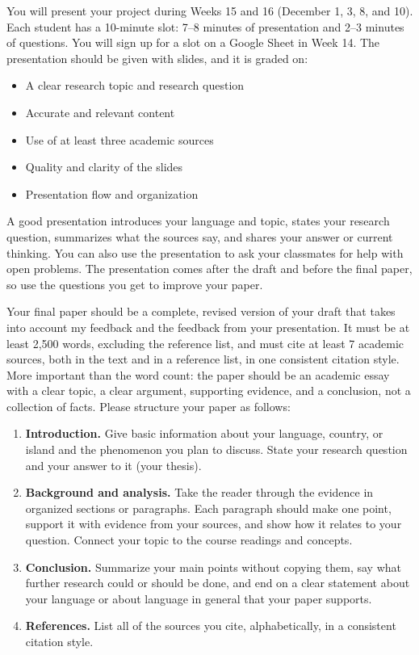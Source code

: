 \documentclass[11pt]{article}
\newcommand{\sect}[1]{\vspace{0.9em}{\large\textbf{#1}}\par\vspace{-0.2em}}
\begin{document}
\sect{Presentation}
You will present your project during Weeks 15 and 16 (December 1, 3, 8, and 10). Each student has a 10-minute slot: 7--8 minutes of presentation and 2--3 minutes of questions. You will sign up for a slot on a Google Sheet in Week 14. The presentation should be given with slides, and it is graded on:

\begin{itemize}
\item A clear research topic and research question
\item Accurate and relevant content
\item Use of at least three academic sources
\item Quality and clarity of the slides
\item Presentation flow and organization
\end{itemize}

A good presentation introduces your language and topic, states your research question, summarizes what the sources say, and shares your answer or current thinking. You can also use the presentation to ask your classmates for help with open problems. The presentation comes after the draft and before the final paper, so use the questions you get to improve your paper.

\sect{Final paper}
Your final paper should be a complete, revised version of your draft that takes into account my feedback and the feedback from your presentation. It must be at least 2,500 words, excluding the reference list, and must cite at least 7 academic sources, both in the text and in a reference list, in one consistent citation style. More important than the word count: the paper should be an academic essay with a clear topic, a clear argument, supporting evidence, and a conclusion, not a collection of facts. Please structure your paper as follows:

\begin{enumerate}[label=\alph*.]
\item \textbf{Introduction.} Give basic information about your language, country, or island and the phenomenon you plan to discuss. State your research question and your answer to it (your thesis).
\item \textbf{Background and analysis.} Take the reader through the evidence in organized sections or paragraphs. Each paragraph should make one point, support it with evidence from your sources, and show how it relates to your question. Connect your topic to the course readings and concepts.
\item \textbf{Conclusion.} Summarize your main points without copying them, say what further research could or should be done, and end on a clear statement about your language or about language in general that your paper supports.
\item \textbf{References.} List all of the sources you cite, alphabetically, in a consistent citation style.
\end{enumerate}
\end{document}
